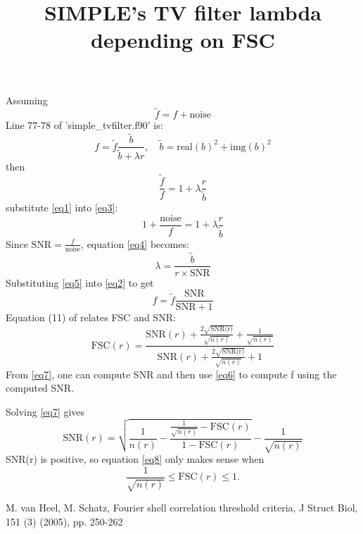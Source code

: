 \documentclass{article}
\begin{document}
\title{SIMPLE's TV filter lambda depending on FSC}
\maketitle
\noindent Assuming
\begin{equation}\label{eq1}
\tilde{f} = f + \text{noise}
\end{equation}
Line 77-78 of 'simple\_tvfilter.f90' is:
\begin{equation}\label{eq2}
f = \tilde{f}\frac{\tilde{b}}{\tilde{b} + \lambda r}, \quad \tilde{b} = \text{real}(b)^2 + \text{img}(b)^2
\end{equation}
then
\begin{equation}\label{eq3}
\frac{\tilde{f}}{f} = 1 + \lambda \frac{r}{\tilde{b}}
\end{equation}
substitute \eqref{eq1} into \eqref{eq3}:
\begin{equation}\label{eq4}
1 + \frac{\text{noise}}{f} = 1 + \lambda \frac{r}{\tilde{b}}
\end{equation}
Since $\text{SNR} = \frac{f}{\text{noise}}$, equation \eqref{eq4} becomes:
\begin{equation}\label{eq5}
\lambda = \frac{\tilde{b}}{r\times\text{SNR}}
\end{equation}
Substituting \eqref{eq5} into \eqref{eq2} to get
\begin{equation}\label{eq6}
f = \tilde{f}\frac{\text{SNR}}{\text{SNR} + 1}
\end{equation}
Equation (11) of \cite{Heel2005} relates FSC and SNR:
\begin{equation}\label{eq7}
\text{FSC}(r) = \frac{\text{SNR}(r) + \frac{2\sqrt{\text{SNR(r)}}}{\sqrt{n(r)}} + \frac{1}{\sqrt{n(r)}}}{\text{SNR}(r) + \frac{2\sqrt{\text{SNR(r)}}}{\sqrt{n(r)}} + 1} 
\end{equation}
From \eqref{eq7}, one can compute SNR and then use \eqref{eq6} to compute f using the computed SNR.

\noindent Solving \eqref{eq7} gives
\begin{equation}\label{eq8}
\text{SNR}(r) = \sqrt{\frac{1}{n(r)} - \frac{\frac{1}{\sqrt{n(r)}}-\text{FSC}(r)}{1 - \text{FSC}(r)}} - \frac{1}{\sqrt{n(r)}}
\end{equation}
SNR(r) is positive, so equation \eqref{eq8} only makes sense when
\begin{equation}\label{eq9}
\frac{1}{\sqrt{n(r)}} \leq \text{FSC}(r) \leq 1.
\end{equation}

\begin{thebibliography}{9}
 M. van Heel, M. Schatz, Fourier shell correlation threshold criteria, J Struct Biol, 151 (3) (2005), pp. 250-262
\end{thebibliography}
\end{document}
